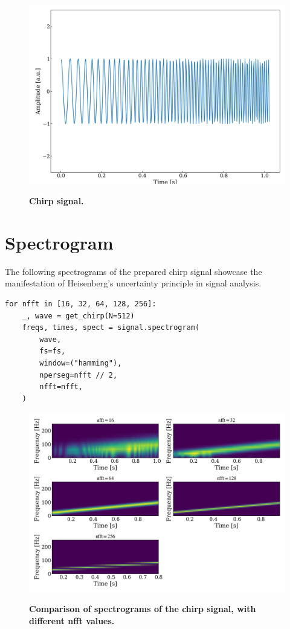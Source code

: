 \documentclass[13pt,a4paper]{article}
\begin{document}
\begin{figure}[ht!]
    \centering
    \caption{\textbf{Chirp signal.}}
    \includegraphics[width=\linewidth]{chirp.png}
    \label{fig:chirp}
\end{figure}
\pagebreak


\section{Spectrogram}

The following spectrograms of the prepared chirp signal showcase the manifestation of Heisenberg's uncertainty principle in signal analysis.

\begin{lstlisting}[caption={\textbf{Snippet for generating spectrogram with different nfft values.}}]
for nfft in [16, 32, 64, 128, 256]:
    _, wave = get_chirp(N=512)
    freqs, times, spect = signal.spectrogram(
        wave,
        fs=fs,
        window=("hamming"),
        nperseg=nfft // 2,
        nfft=nfft,
    )
\end{lstlisting}

\begin{figure}[ht!]
    \centering
    \caption{\textbf{Comparison of spectrograms of the chirp signal, with different nfft values.}}
    \includegraphics[width=\linewidth]{spectrogram_nfft.png}
    \label{fig:spectrogram_nfft}
\end{figure}
\pagebreak
\end{document}
